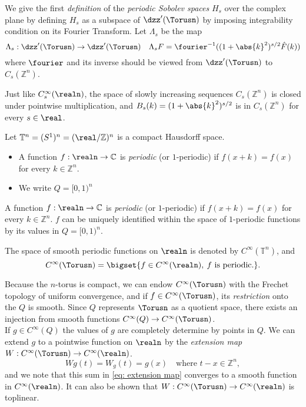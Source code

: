 \documentclass[../main-v2-manifolds.tex]{subfiles}
\begin{document}
We give the first \emph{definition} of the \emph{periodic Sobolev spaces} $H_s$ over the complex plane by defining $H_s$ as a subspace of $\dzz'(\Torusn)$ by imposing integrability condition on its Fourier Transform. Let $\Lambda_s$ be the map
\[
\Lambda_s: \dzz'(\Torusn)\to \dzz'(\Torusn)\quad \Lambda_s F = \fourier^{-1}((1+\abs{k}^2)^{s/2}\hat{F}(k))
\]
where $\fourier$ and its inverse should be viewed from $\dzz'(\Torusn)$ to $C_s(\mathbb{Z}^n)$.

\begin{remark}
Just like $C^\infty_s(\realn)$, the space of slowly increasing sequences $C_s(\mathbb{Z}^n)$ is closed under pointwise multiplication, and $B_s(k) = (1+\abs{k}^2)^{s/2}$ is in $C_s(\mathbb{Z}^n)$ for every $s\in\real$.
\end{remark}
Let $\mathbb{T}^n = (S^1)^n = (\real/\mathbb{Z})^n$ is a compact Hausdorff space. 
\begin{itemize}
    \item A function $f: \realn\to\mathbb{C}$ is \emph{periodic} (or $1$-periodic) if $f(x+k) = f(x)$ for every $k\in\mathbb{Z}^n$. 
    \item We write $Q = [0,1)^n$
\end{itemize}


\begin{definition}
A function $f: \realn\to\mathbb{C}$ is \emph{periodic} (or $1$-periodic) if $f(x+k) = f(x)$ for every $k\in\mathbb{Z}^n$. $f$ can be uniquely identified within the space of $1$-periodic functions by its values in $Q=[0,1)^n$. 
\end{definition}
\begin{definition}
    The space of smooth periodic functions on $\realn$ is denoted by $C^\infty(\mathbb{T}^n)$, and
    \[
    C^\infty(\Torusn) = \bigset{f\in C^\infty(\realn),\: f\text{ is periodic.}}.
    \]
\end{definition}

    Because the $n$-torus is compact, we can endow $C^\infty(\Torusn)$ with the Frechet topology of uniform convergence, and if $f\in C^\infty(\Torusn)$, its \emph{restriction} onto the $Q$ is smooth. Since $Q$ represents $\Torusn$ as a quotient space, there exists an injection from smooth functions $C^\infty(Q)\to C^\infty(\Torusn)$. \\

If $g\in C^\infty(Q)$ the values of $g$ are completely determine by points in $Q$. We can extend $g$ to a pointwise function on $\realn$ by the \emph{extension map} $W: C^\infty(\Torusn)\to C^\infty(\realn)$. 
\begin{equation}
Wg(t) = W_g(t) = g(x)\quad \text{where } t-x\in\mathbb{Z}^n,
\label{eq: extension map}
\end{equation}
and we note that this sum in \cref{eq: extension map} converges to a smooth function in $C^\infty(\realn)$. It can also be shown that $W: C^\infty(\Torusn)\to C^\infty(\realn)$ is toplinear.\\
\end{document}
